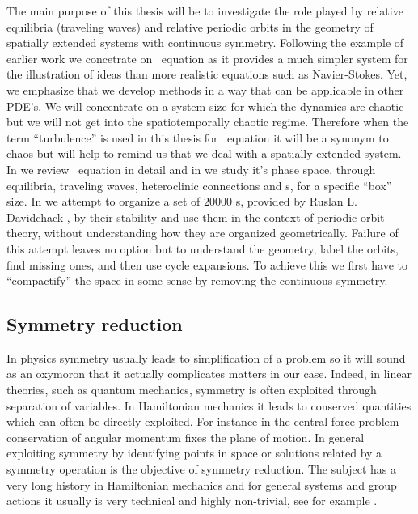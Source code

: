The main purpose of this thesis will be to investigate the role played by relative equilibria (traveling waves) 
and relative periodic orbits in the geometry of spatially extended systems with continuous symmetry. Following
the example of earlier work we concetrate on \KS\ equation as it provides a much simpler system for the illustration
of ideas than more realistic equations such as Navier-Stokes. Yet, we emphasize that we develop methods in
a way that can be applicable in other PDE's. We will concentrate on a system size for which the dynamics
are chaotic but we will not get into the spatiotemporally chaotic regime. Therefore when the term ``turbulence'' is
used in this thesis for \KS\ equation it will be a synonym to chaos but will help  
to remind us that we deal with a spatially extended system. In  we review \KS\ equation in detail
and in  we study it's phase space, through equilibria, traveling waves, heteroclinic connections
and \rpo s, for a specific ``box'' size. In  we attempt to
organize a set of $20000$ \rpo s, provided by Ruslan L. Davidchack , by their stability and use them in the context of periodic orbit theory, without understanding how they are organized geometrically. Failure of this attempt leaves no option but to understand the geometry, label the orbits, find missing ones, and then use cycle expansions.
To achieve this we first have to ``compactify'' the space in some sense by removing the continuous symmetry.

\subsection{Symmetry reduction}

In physics symmetry usually leads to simplification of a problem so it will sound as an oxymoron that it actually
complicates matters in our case. Indeed, in linear theories, such as quantum mechanics, symmetry is often exploited
through separation of variables. In Hamiltonian mechanics it leads to conserved quantities which can often be
directly exploited. For instance in the central force problem conservation of angular momentum fixes the plane
of motion. %
In general exploiting symmetry by identifying points in space or solutions 
related by a symmetry operation is the objective of 
symmetry reduction. The subject has a very long history in Hamiltonian mechanics and for general systems
and group actions it usually is very technical and highly non-trivial, see for example .

